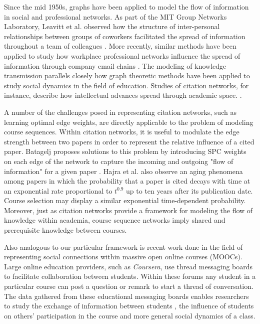 \documentclass{sigchi}
\begin{document}
Since the mid 1950s, graphs have been applied to model the flow of information in social and professional networks. As part of the MIT Group Networks Laboratory, Leavitt et al. observed how the structure of inter-personal relationships between groups of coworkers facilitated the spread of information throughout a team of colleagues \cite{Leavitt1951}. More recently, similar methods have been applied to study how workplace professional networks influence the spread of information through company email chains \cite{Fisher2004}. The modeling of knowledge transmission parallels closely how graph theoretic methods have been applied to study social dynamics in the field of education. Studies of citation networks, for instance, describe how intellectual advances spread through academic space. \cite{Batagelj2003}\cite{Garfield1964}. 



A number of the challenges posed in representing citation networks, such as learning optimal edge weights, are directly applicable to the problem of modeling course sequences. Within citation networks, it is useful to modulate the edge strength between two papers in order to represent the relative influence of a cited paper. Batagelj proposes solutions to this problem by introducing SPC weights on each edge of the network to capture the incoming and outgoing "flow of information" for a given paper \cite{Batagelj2003}. Hajra et al. also observe an aging phenomena among papers in which the probability that a paper is cited decays with time at an exponential rate proportional to $t^{0.9}$ up to ten years after its publication date. Course selection may display a similar exponential time-dependent probability. Moreover, just as citation networks provide a framework for modeling the flow of knowledge within academia, course sequence networks imply shared and prerequisite knowledge between courses. 

Also analogous to our particular framework is recent work done in the field of representing social connections within massive open online courses (MOOCs). Large online education providers, such as \textit{Coursera}, use thread messaging boards to facilitate collaboration between students. Within these forums any student in a particular course can post a question or remark to start a thread of conversation. The data gathered from these educational messaging boards enables researchers to study the exchange of information between students \cite{Brinton2016}, the influence of students on others' participation in the course \cite{Sinha2014a} and more general social dynamics of a class.
\end{document}
